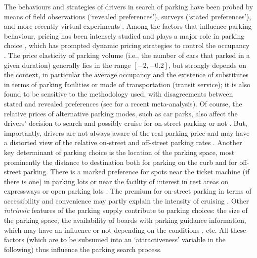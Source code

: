 \documentclass[trsc,reprint]{informs3}
\newcommand{\AN}[1]{#1}
\begin{document}
The behaviours and strategies of drivers in search of parking have been \AN{probed}
by means of field observations (`revealed preferences'), surveys (`stated preferences'), and more recently \AN{virtual experiments} \citep{fulman2020modeling}. \AN{Among} the factors that influence parking behaviour, pricing has been intensely studied and plays a major role in parking choice \citep{brooke2014street,shoup2018parking,gao2021smartphone}, which has prompted dynamic pricing strategies to control the occupancy \citep{chatman2014theory}. The price elasticity of parking volume (i.e., the number of cars that parked in a given duration) generally lies in the range $[-2,-0.2]$, but strongly depends on the context, in particular the average occupancy and the existence of substitutes in terms of parking facilities or mode of transportation (transit service); it is also found to be sensitive to the methodology used, with disagreements between stated
and revealed preferences (see \citep{lehner2019price} for a recent meta-analysis).
\AN{Of course, the relative prices of alternative parking modes, such as car parks, also affect the drivers' decision
to search and possibly cruise for on-street parking or not \citep{assemi2020searching}.
But, importantly, drivers are not always aware of the real parking price and may have a distorted view of the relative on-street and off-street parking rates \citep{lee2017cruising}.}
Another key determinant of parking choice is the location of the parking space, most prominently the distance to destination both for parking on the curb and for off-street parking. There is a marked preference for spots near the ticket machine (if there is one) in parking lots \citep{vo2016micro} or near the facility of interest in rest areas on expressways \citep{tanaka2017analysis} or open parking lots \citep{paidi2022co2}. 
\AN{The premium for on-street parking in terms of accessibility and convenience may partly explain the intensity of cruising \citep{lee2017cruising}.}
\AN{Other \emph{intrinsic}} features of the parking supply
\AN{contribute to parking choices:} the size of the parking space,
the availability of boards with parking guidance information, which may have an influence or not depending on the conditions \citep{axhausen1994effectiveness,tanaka2017analysis}, etc. All these factors (which are to be subsumed into an `attractiveness' variable in the following) thus influence the parking search process.
\end{document}
